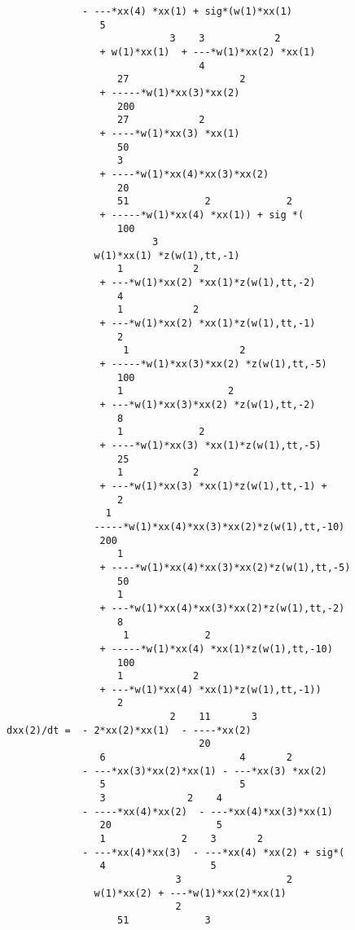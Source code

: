\documentclass[11pt,a5paper]{article}
\begin{document}
\begin{verbatim}
             - ---*xx(4) *xx(1) + sig*(w(1)*xx(1)
                5
                            3    3            2
                + w(1)*xx(1)  + ---*w(1)*xx(2) *xx(1)
                                 4
                   27                   2
                + -----*w(1)*xx(3)*xx(2)
                   200
                   27            2
                + ----*w(1)*xx(3) *xx(1)
                   50
                   3
                + ----*w(1)*xx(4)*xx(3)*xx(2)
                   20
                   51             2             2
                + -----*w(1)*xx(4) *xx(1)) + sig *(
                   100
                         3
               w(1)*xx(1) *z(w(1),tt,-1)
                   1            2
                + ---*w(1)*xx(2) *xx(1)*z(w(1),tt,-2)
                   4
                   1            2
                + ---*w(1)*xx(2) *xx(1)*z(w(1),tt,-1)
                   2
                    1                   2
                + -----*w(1)*xx(3)*xx(2) *z(w(1),tt,-5)
                   100
                   1                  2
                + ---*w(1)*xx(3)*xx(2) *z(w(1),tt,-2)
                   8
                   1             2
                + ----*w(1)*xx(3) *xx(1)*z(w(1),tt,-5)
                   25
                   1            2
                + ---*w(1)*xx(3) *xx(1)*z(w(1),tt,-1) + 
                   2
                 1
               -----*w(1)*xx(4)*xx(3)*xx(2)*z(w(1),tt,-10)
                200
                   1
                + ----*w(1)*xx(4)*xx(3)*xx(2)*z(w(1),tt,-5)
                   50
                   1
                + ---*w(1)*xx(4)*xx(3)*xx(2)*z(w(1),tt,-2)
                   8
                    1             2
                + -----*w(1)*xx(4) *xx(1)*z(w(1),tt,-10)
                   100
                   1            2
                + ---*w(1)*xx(4) *xx(1)*z(w(1),tt,-1))
                   2
                            2    11       3
dxx(2)/dt =  - 2*xx(2)*xx(1)  - ----*xx(2)
                                 20
                6                       4       2
             - ---*xx(3)*xx(2)*xx(1) - ---*xx(3) *xx(2)
                5                       5
                3              2    4
             - ----*xx(4)*xx(2)  - ---*xx(4)*xx(3)*xx(1)
                20                  5
                1             2    3       2
             - ---*xx(4)*xx(3)  - ---*xx(4) *xx(2) + sig*(
                4                  5
                             3                  2
               w(1)*xx(2) + ---*w(1)*xx(2)*xx(1)
                             2
                   51             3

\end{verbatim}
\end{document}
